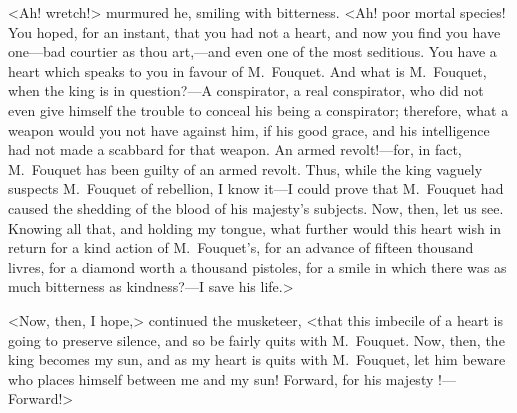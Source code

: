 <Ah! wretch!> murmured he, smiling with bitterness. <Ah! poor mortal species! You hoped, for an instant, that you had not a heart, and now you find you have one—bad courtier as thou art,—and even one of the most seditious. You have a heart which speaks to you in favour of M.~Fouquet. And what is M.~Fouquet, when the king is in question?—A conspirator, a real conspirator, who did not even give himself the trouble to conceal his being a conspirator; therefore, what a weapon would you not have against him, if his good grace, and his intelligence had not made a scabbard for that weapon. An armed revolt!—for, in fact, M.~Fouquet has been guilty of an armed revolt. Thus, while the king vaguely suspects M.~Fouquet of rebellion, I know it—I could prove that M.~Fouquet had caused the shedding of the blood of his majesty's subjects. Now, then, let us see. Knowing all that, and holding my tongue, what further would this heart wish in return for a kind action of M.~Fouquet's, for an advance of fifteen thousand livres, for a diamond worth a thousand pistoles, for a smile in which there was as much bitterness as kindness?—I save his life.>

<Now, then, I hope,> continued the musketeer, <that this imbecile of a heart is going to preserve silence, and so be fairly quits with M.~Fouquet. Now, then, the king becomes my sun, and as my heart is quits with M.~Fouquet, let him beware who places himself between me and my sun! Forward, for his majesty !—Forward!>


